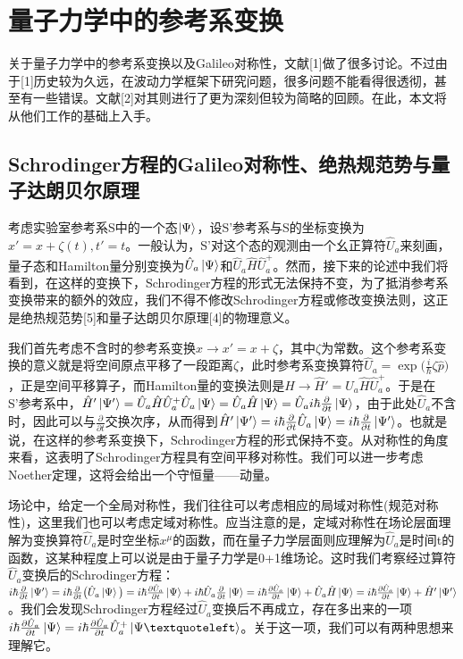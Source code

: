 \documentclass[a4paper]{article}
\begin{document}
    \section{量子力学中的参考系变换}

        关于量子力学中的参考系变换以及Galileo对称性，文献[1]做了很多讨论。不过由于[1]历史较为久远，在波动力学框架下研究问题，很多问题不能看得很透彻，甚至有一些错误。文献[2]对其则进行了更为深刻但较为简略的回顾。在此，本文将从他们工作的基础上入手。

    \subsection{Schrodinger方程的Galileo对称性、绝热规范势与量子达朗贝尔原理}
        考虑实验室参考系S中的一个态$\ket{\Psi}$，设S'参考系与S的坐标变换为$x'=x+\zeta(t), t'=t$。一般认为，S'对这个态的观测由一个幺正算符$\hat{U}_a$来刻画，量子态和Hamilton量分别变换为$\hat{U}_a\ket{\Psi}$和$\hat{U}_a\hat{H}\hat{U}_a^+$。然而，接下来的论述中我们将看到，在这样的变换下，Schrodinger方程的形式无法保持不变，为了抵消参考系变换带来的额外的效应，我们不得不修改Schrodinger方程或修改变换法则，这正是绝热规范势[5]和量子达朗贝尔原理[4]的物理意义。

        我们首先考虑不含时的参考系变换$x\rightarrow x'=x+\zeta$，其中$\zeta$为常数。这个参考系变换的意义就是将空间原点平移了一段距离$\zeta$，此时参考系变换算符$\hat{U}_a=\exp\big(\frac{i}{\hbar}\zeta\hat{p} \big)$，正是空间平移算子，而Hamilton量的变换法则是$\hat{H}\rightarrow \hat{H}'=\hat{U}_a\hat{H}\hat{U}_a^+$。于是在S'参考系中，$\hat{H}'\ket{\Psi'}=\hat{U}_a\hat{H}\hat{U}_a^+\hat{U}_a\ket{\Psi}=\hat{U}_a\hat{H}\ket{\Psi}=\hat{U}_a i\hbar\frac{\partial}{\partial t}\ket{\Psi}$，由于此处$\hat{U}_a$不含时，因此可以与$\frac{\partial}{\partial t}$交换次序，从而得到$\hat{H}'\ket{\Psi'}=i\hbar\frac{\partial}{\partial t}\hat{U}_a\ket{\Psi}=i\hbar\frac{\partial}{\partial t}\ket{\Psi'}$。也就是说，在这样的参考系变换下，Schrodinger方程的形式保持不变。从对称性的角度来看，这表明了Schrodinger方程具有空间平移对称性。我们可以进一步考虑Noether定理，这将会给出一个守恒量——动量。

        场论中，给定一个全局对称性，我们往往可以考虑相应的局域对称性(规范对称性)，这里我们也可以考虑定域对称性。应当注意的是，定域对称性在场论层面理解为变换算符$\hat{U}_a$是时空坐标$x^\mu$的函数，而在量子力学层面则应理解为$\hat{U}_a$是时间t的函数，这某种程度上可以说是由于量子力学是0+1维场论。这时我们考察经过算符$\hat{U}_a$变换后的Schrodinger方程：$i\hbar\frac{\partial}{\partial t}\ket{\Psi'} = i\hbar\frac{\partial}{\partial t}\big(\hat{U}_a\ket{\Psi}\big) = i\hbar\frac{\partial\hat{U}_a}{\partial t}\ket{\Psi} + i\hbar\hat{U}_a\frac{\partial}{\partial t}\ket{\Psi} = i\hbar\frac{\partial\hat{U}_a}{\partial t}\ket{\Psi} + \hat{U}_a\hat{H}\ket{\Psi} = i\hbar\frac{\partial\hat{U}_a}{\partial t}\ket{\Psi} + \hat{H}'\ket{\Psi'}$。我们会发现Schrodinger方程经过$\hat{U}_a$变换后不再成立，存在多出来的一项$i\hbar\frac{\partial\hat{U}_a}{\partial t}\ket{\Psi} = i\hbar\frac{\partial\hat{U}_a}{\partial t}\hat{U}_a^+\ket{\Psi‘}$。关于这一项，我们可以有两种思想来理解它。
\end{document}
